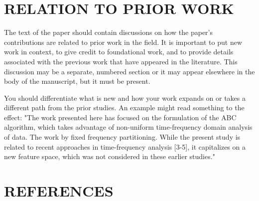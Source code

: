 \documentclass{article}
\begin{document}

\section{RELATION TO PRIOR WORK}
\label{sec:prior}

The text of the paper should contain discussions on how the paper's
contributions are related to prior work in the field. It is important
to put new work in  context, to give credit to foundational work, and
to provide details associated with the previous work that have appeared
in the literature. This discussion may be a separate, numbered section
or it may appear elsewhere in the body of the manuscript, but it must
be present.

You should differentiate what is new and how your work expands on
or takes a different path from the prior studies. An example might
read something to the effect: "The work presented here has focused
on the formulation of the ABC algorithm, which takes advantage of
non-uniform time-frequency domain analysis of data. The work by
fixed frequency partitioning. While the present study is related
to recent approaches in time-frequency analysis [3-5], it capitalizes
on a new feature space, which was not considered in these earlier
studies."

\vfill\pagebreak

\section{REFERENCES}
\label{sec:refs}




\end{document}
